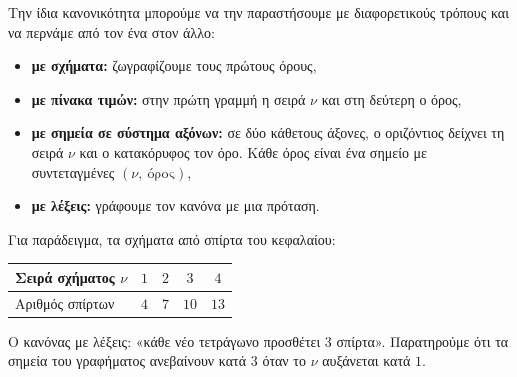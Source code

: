 
Την ίδια κανονικότητα μπορούμε να την παραστήσουμε με διαφορετικούς τρόπους και να περνάμε από τον ένα στον άλλο:
\begin{itemize}[leftmargin=1.2em,itemsep=0.3ex,topsep=2pt]
\item \textbf{με σχήματα:} ζωγραφίζουμε τους πρώτους όρους,
\item \textbf{με πίνακα τιμών:} στην πρώτη γραμμή η σειρά $\nu$ και στη δεύτερη ο όρος,
\item \textbf{με σημεία σε σύστημα αξόνων:} σε δύο κάθετους άξονες, ο οριζόντιος δείχνει τη σειρά $\nu$ και ο κατακόρυφος τον όρο. Κάθε όρος είναι ένα σημείο με συντεταγμένες $(\nu,\ \text{όρος})$,
\item \textbf{με λέξεις:} γράφουμε τον κανόνα με μια πρόταση.
\end{itemize}

Για παράδειγμα, τα σχήματα από σπίρτα του κεφαλαίου:
\begin{center}
\qquad{}\qquad{}\qquad{}
\end{center}
\begin{center}
\renewcommand{\arraystretch}{1.3}
\begin{tabular}{|l|c|c|c|c|}\hline
Σειρά σχήματος $\nu$ & $1$ & $2$ & $3$ & $4$\\\hline
Αριθμός σπίρτων & $4$ & $7$ & $10$ & $13$\\\hline
\end{tabular}
\end{center}
\begin{center}
\end{center}
Ο κανόνας με λέξεις: «κάθε νέο τετράγωνο προσθέτει $3$ σπίρτα». Παρατηρούμε ότι τα σημεία του γραφήματος ανεβαίνουν κατά $3$ όταν το $\nu$ αυξάνεται κατά $1$.

